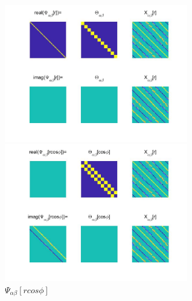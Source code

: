 \documentclass{Note}
\begin{document}
\begin{figure}[htbp]
\centering
\begin{minipage}[t]{0.48\textwidth}
\centering
\includegraphics[width=8cm]{Psi_alpha_beta[r].jpg}
\caption{$\Psi_{\alpha\beta}[r]$}
\end{minipage}
\begin{minipage}[t]{0.48\textwidth}
\centering
\includegraphics[width=8cm]{Psi_alpha_beta[rcos_phi].jpg}
\caption{$\Psi_{\alpha\beta}[rcos\phi]$}
\end{minipage}
\end{figure}
\end{document}
